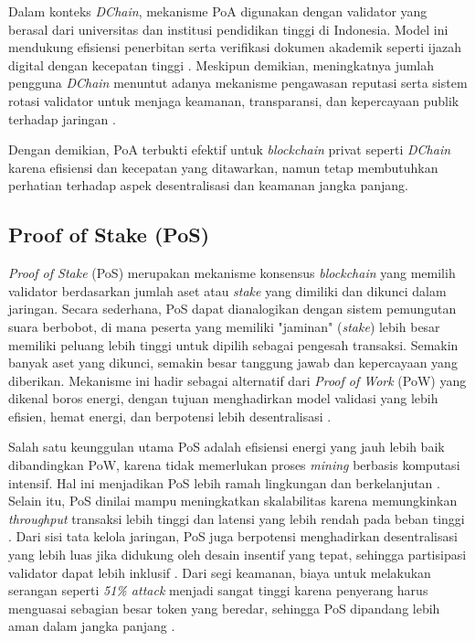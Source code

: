 Dalam konteks \textit{DChain}, mekanisme PoA digunakan dengan validator yang berasal dari universitas dan institusi pendidikan tinggi di Indonesia. Model ini mendukung efisiensi penerbitan serta verifikasi dokumen akademik seperti ijazah digital dengan kecepatan tinggi \cite{joshi2021, chikezie2021}. Meskipun demikian, meningkatnya jumlah pengguna \textit{DChain} menuntut adanya mekanisme pengawasan reputasi serta sistem rotasi validator untuk menjaga keamanan, transparansi, dan kepercayaan publik terhadap jaringan \cite{joshi2021, qiu2022}.

Dengan demikian, PoA terbukti efektif untuk \textit{blockchain} privat seperti \textit{DChain} karena efisiensi dan kecepatan yang ditawarkan, namun tetap membutuhkan perhatian terhadap aspek desentralisasi dan keamanan jangka panjang.


\subsection{Proof of Stake (PoS)}

\textit{Proof of Stake} (PoS) merupakan mekanisme konsensus \textit{blockchain} yang memilih validator berdasarkan jumlah aset atau \textit{stake} yang dimiliki dan dikunci dalam jaringan. Secara sederhana, PoS dapat dianalogikan dengan sistem pemungutan suara berbobot, di mana peserta yang memiliki "jaminan" (\textit{stake}) lebih besar memiliki peluang lebih tinggi untuk dipilih sebagai pengesah transaksi. Semakin banyak aset yang dikunci, semakin besar tanggung jawab dan kepercayaan yang diberikan. Mekanisme ini hadir sebagai alternatif dari \textit{Proof of Work} (PoW) yang dikenal boros energi, dengan tujuan menghadirkan model validasi yang lebih efisien, hemat energi, dan berpotensi lebih desentralisasi \cite{zhang2025, li2023, feng2023}.

Salah satu keunggulan utama PoS adalah efisiensi energi yang jauh lebih baik dibandingkan PoW, karena tidak memerlukan proses \textit{mining} berbasis komputasi intensif. Hal ini menjadikan PoS lebih ramah lingkungan dan berkelanjutan \cite{zhang2025, li2023, wendl2022, mandal2023}. Selain itu, PoS dinilai mampu meningkatkan skalabilitas karena memungkinkan \textit{throughput} transaksi lebih tinggi dan latensi yang lebih rendah pada beban tinggi \cite{zhang2025, ge2022, li2020}. Dari sisi tata kelola jaringan, PoS juga berpotensi menghadirkan desentralisasi yang lebih luas jika didukung oleh desain insentif yang tepat, sehingga partisipasi validator dapat lebih inklusif \cite{li2023, nguyen2019}. Dari segi keamanan, biaya untuk melakukan serangan seperti \textit{51\% attack} menjadi sangat tinggi karena penyerang harus menguasai sebagian besar token yang beredar, sehingga PoS dipandang lebih aman dalam jangka panjang \cite{john2025, li2020}.

